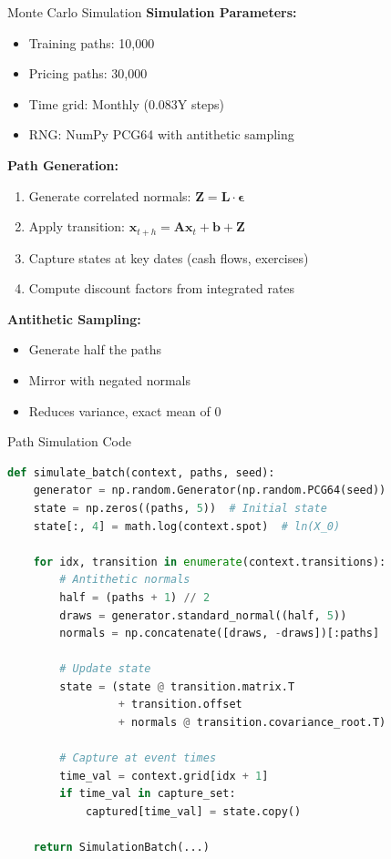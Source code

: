 \documentclass[aspectratio=169,11pt]{beamer}
\begin{document}
\begin{frame}{Monte Carlo Simulation}
\textbf{Simulation Parameters:}
\begin{itemize}
    \item Training paths: 10,000
    \item Pricing paths: 30,000
    \item Time grid: Monthly (0.083Y steps)
    \item RNG: NumPy PCG64 with antithetic sampling
\end{itemize}

\textbf{Path Generation:}
\begin{enumerate}
    \item Generate correlated normals: $\mathbf{Z} = \mathbf{L} \cdot \mathbf{\epsilon}$
    \item Apply transition: $\mathbf{x}_{t+h} = \mathbf{A}\mathbf{x}_t + \mathbf{b} + \mathbf{Z}$
    \item Capture states at key dates (cash flows, exercises)
    \item Compute discount factors from integrated rates
\end{enumerate}

\textbf{Antithetic Sampling:}
\begin{itemize}
    \item Generate half the paths
    \item Mirror with negated normals
    \item Reduces variance, exact mean of 0
\end{itemize}
\end{frame}

\begin{frame}[fragile]{Path Simulation Code}
\begin{lstlisting}[language=Python]
def simulate_batch(context, paths, seed):
    generator = np.random.Generator(np.random.PCG64(seed))
    state = np.zeros((paths, 5))  # Initial state
    state[:, 4] = math.log(context.spot)  # ln(X_0)

    for idx, transition in enumerate(context.transitions):
        # Antithetic normals
        half = (paths + 1) // 2
        draws = generator.standard_normal((half, 5))
        normals = np.concatenate([draws, -draws])[:paths]

        # Update state
        state = (state @ transition.matrix.T
                 + transition.offset
                 + normals @ transition.covariance_root.T)

        # Capture at event times
        time_val = context.grid[idx + 1]
        if time_val in capture_set:
            captured[time_val] = state.copy()

    return SimulationBatch(...)
\end{lstlisting}
\end{frame}
\end{document}

